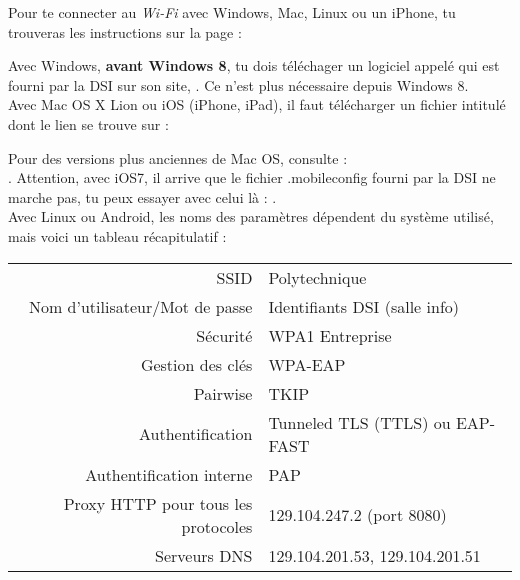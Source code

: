 Pour te connecter au \emph{Wi-Fi} avec Windows, Mac, Linux ou un iPhone, tu trouveras les instructions sur la page : 
\begin{center}
\end{center}

Avec Windows, \textbf{avant Windows 8}, tu dois téléchager un logiciel appelé  qui est fourni par la DSI sur son site, . Ce n'est plus nécessaire depuis Windows 8.\\

Avec Mac OS X Lion ou iOS (iPhone, iPad), il faut télécharger un fichier intitulé
\newline {} dont le lien se trouve sur :
\begin{center}
\end{center}

Pour des versions plus anciennes de Mac OS, consulte :\\ . Attention, avec iOS7, il arrive que le fichier .mobileconfig fourni par la DSI ne marche pas, tu peux essayer avec celui là : .\\

Avec Linux ou Android, les noms des paramètres dépendent du système utilisé, mais voici un tableau récapitulatif :
\begin{center}
\begin{tabular}{r|l}
 SSID & Polytechnique \\
 Nom d'utilisateur/Mot de passe & Identifiants DSI (salle info) \\
 Sécurité & WPA1 Entreprise \\
 Gestion des clés & WPA-EAP \\
 Pairwise & TKIP \\
 Authentification & Tunneled TLS (TTLS) ou EAP-FAST \\
 Authentification interne & PAP \\
 Proxy HTTP pour tous les protocoles & 129.104.247.2 (port 8080) \\
 Serveurs DNS & 129.104.201.53, 129.104.201.51
\end{tabular}
\end{center}




